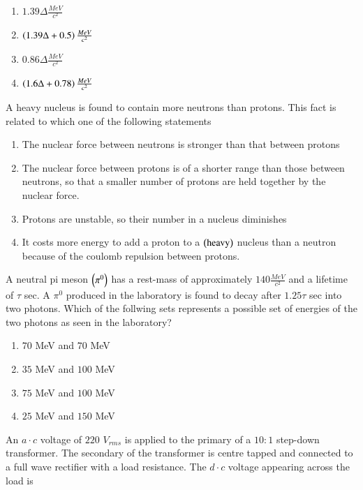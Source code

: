 \documentclass[journal]{IEEEtran}
\begin{document}
\begin{enumerate}
{{\begin{multicols}{2}
\begin{enumerate}
\item $1.39\Delta\frac{MeV}{c^2}$ 
\item $\left(1.39\Delta+0.5\right)\frac{MeV}{c^2}$
\item $0.86\Delta\frac{MeV}{c^2}$ 
\item $\left(1.6\Delta+0.78\right)\frac{MeV}{c^2}$
\end{enumerate}
\end{multicols}
}
\item{
A heavy nucleus is found to contain more neutrons than protons. This fact is related to which one of the following statements
\begin{enumerate}
\item The nuclear force between neutrons is stronger than that between protons
\item The nuclear force between protons is of a shorter range than those between neutrons, so that a smaller number of protons are held together by the nuclear force.
\item Protons are unstable, so their number in a nucleus diminishes
\item It costs more energy to add a proton to a $\left(\text{heavy}\right)$ nucleus than a neutron because of the coulomb repulsion between protons.
\end{enumerate}
}
\item{
A neutral pi meson $\left(\pi^0\right)$ has a rest-mass of approximately $140\frac{MeV}{c^2}$ and a lifetime of $\tau$ sec. A $\pi^0$ produced in the laboratory is found to decay after $1.25\tau$ sec into two photons. Which of the follwing sets represents a possible set of energies of the two photons as seen in the laboratory?
\begin{multicols}{2}
\begin{enumerate}
\item $70$ MeV and $70$ MeV
\item $35$ MeV and $100$ MeV
\item $75$ MeV and $100$ MeV  
\item $25$ MeV and $150$ MeV
\end{enumerate}
\end{multicols}
}
\item{
An $a\cdot c$ voltage of $220$ $V_{rms}$ is applied to the primary of a $10:1$ step-down transformer. The secondary of the transformer is centre tapped and connected to a full wave rectifier with a load resistance. The $d\cdot c$ voltage appearing across the load is 
}}
\end{enumerate}
\end{document}
